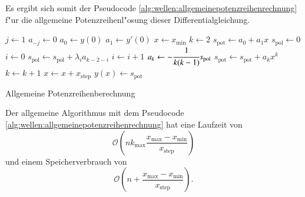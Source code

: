 Es ergibt sich somit der 
Pseudocode \ref{alg:wellen:allgemeinepotenzreihenrechnung} f"ur die 
allgemeine Potenzreihenl"osung dieser Differentialgleichung.

\begin{algorithm}
	\begin{algorithmic}[1]
		\State $j \gets 1$
			\State $a_{-j} \gets 0$
		\EndFor
		\State $a_0 \gets y(0)$
		\State $a_1 \gets y'(0)$
		\State $x \gets x_{\text{min}}$
			\State $k \gets 2$
			\State $s_{\text{pot}} \gets a_0 + a_1x$
				\State $s_{\text{pol}} \gets 0$
				\State $i \gets 0$
					\State $s_{\text{pol}} \gets s_{\text{pol}}+\lambda_i 
					a_{k-2-i}$
					\State $i \gets i + 1$
				\EndFor
				\State $a_k \gets -\cfrac{1}{k(k-1)} s_{\text{pol}}$
				\State $s_{\text{pot}} \gets s_{\text{pot}} + a_k x^k$
				\State $k \gets k + 1$
			\EndFor
			\State $x \gets x + x_{\text{step}}$
			\State $y(x) \gets s_{\text{pot}}$
		\EndFor
	\end{algorithmic}
	
	\caption{Allgemeine Potenzreihenberechnung} 
	\label{alg:wellen:allgemeinepotenzreihenrechnung}
\end{algorithm}

Der allgemeine Algorithmus mit dem Pseudocode 
\ref{alg:wellen:allgemeinepotenzreihenrechnung} hat eine Laufzeit von
\begin{equation*}
	\mathcal{O}
	\left(
		nk_{\text{max}}\frac{x_{\text{max}}-x_{\text{min}}}{x_{\text{step}}}
	\right)
\end{equation*}
und einem Speicherverbrauch von
\begin{equation*}
	\mathcal{O}
	\left(
		n + \frac{x_{\text{max}}-x_{\text{min}}}{x_{\text{step}}}
	\right).
\end{equation*}